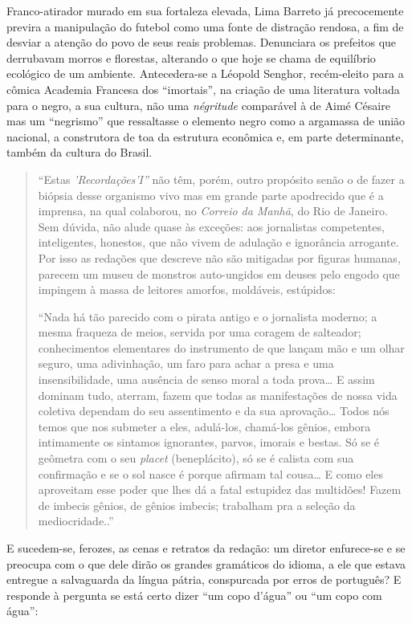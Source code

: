 \documentclass[
  letterpaper,
  DIV=11,
  numbers=noendperiod]{scrreprt}
\begin{document}
Franco-atirador murado em sua fortaleza elevada, Lima Barreto já
precocemente previra a manipulação do futebol como uma fonte de
distração rendosa, a fim de desviar a atenção do povo de seus reais
problemas. Denunciara os prefeitos que derrubavam morros e florestas,
alterando o que hoje se chama de equilíbrio ecológico de um ambiente.
Antecedera-se a Léopold Senghor, recém-eleito para a cômica Academia
Francesa dos ``imortais'', na criação de uma literatura voltada para o
negro, a sua cultura, não uma \emph{négritude} comparável à de Aimé
Césaire mas um ``negrismo'' que ressaltasse o elemento negro como a
argamassa de união nacional, a construtora de toa da estrutura econômica
e, em parte determinante, também da cultura do Brasil.

\begin{quote}
``Estas \emph{'Recordações'I''} não têm, porém, outro propósito senão o
de fazer a biópsia desse organismo vivo mas em grande parte apodrecido
que é a imprensa, na qual colaborou, no \emph{Correio da Manhã}, do Rio
de Janeiro. Sem dúvida, não alude quase às exceções: aos jornalistas
competentes, inteligentes, honestos, que não vivem de adulação e
ignorância arrogante. Por isso as redações que descreve não são
mitigadas por figuras humanas, parecem um museu de monstros auto-ungidos
em deuses pelo engodo que impingem à massa de leitores amorfos,
moldáveis, estúpidos:~

``Nada há tão parecido com o pirata antigo e o jornalista moderno; a
mesma fraqueza de meios, servida por uma coragem de salteador;
conhecimentos elementares do instrumento de que lançam mão e um olhar
seguro, uma adivinhação, um faro para achar a presa e uma
insensibilidade, uma ausência de senso moral a toda prova\ldots{} E
assim dominam tudo, aterram, fazem que todas as manifestações de nossa
vida coletiva dependam do seu assentimento e da sua aprovação\ldots{}
Todos nós temos que nos submeter a eles, adulá-los, chamá-los gênios,
embora intimamente os sintamos ignorantes, parvos, imorais e bestas. Só
se é geômetra com o seu \emph{placet} (beneplácito), só se é calista com
sua confirmação e se o sol nasce é porque afirmam tal cousa\ldots{} E
como eles aproveitam esse poder que lhes dá a fatal estupidez das
multidões! Fazem de imbecis gênios, de gênios imbecis; trabalham pra a
seleção da mediocridade..''
\end{quote}

E sucedem-se, ferozes, as cenas e retratos da redação: um diretor
enfurece-se e se preocupa com o que dele dirão os grandes gramáticos do
idioma, a ele que estava entregue a salvaguarda da língua pátria,
conspurcada por erros de português? E responde à pergunta se está certo
dizer ``um copo d'água'' ou ``um copo com água'':
\end{document}
